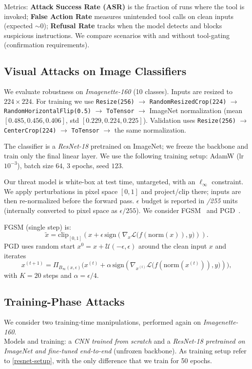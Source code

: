 \documentclass{article}
\begin{document}
Metrics: \textbf{Attack Success Rate (ASR)} is the fraction of runs where the tool is invoked; \textbf{False Action Rate} measures unintended tool calls on clean inputs (expected ${\sim}0$); \textbf{Refusal Rate} tracks when the model detects and blocks suspicious instructions. We compare scenarios with and without tool-gating (confirmation requirements).

\subsection{Visual Attacks on Image Classifiers}
We evaluate robustness on \textit{Imagenette-160} (10 classes). Inputs are resized to $224{\times}224$. For training we use \texttt{Resize(256)} $\rightarrow$ \texttt{RandomResizedCrop(224)} $\rightarrow$ \texttt{RandomHorizontalFlip(0.5)} $\rightarrow$ \texttt{ToTensor} $\rightarrow$ ImageNet normalization (mean $[0.485,0.456,0.406]$, std $[0.229,0.224,0.225]$).\cite{torchvision-resnet18} Validation uses \texttt{Resize(256)} $\rightarrow$ \texttt{CenterCrop(224)} $\rightarrow$ \texttt{ToTensor} $\rightarrow$ the same normalization.

The classifier is a \textit{ResNet-18} pretrained on ImageNet; we freeze the backbone and train only the final linear layer. We use the following training setup: AdamW (lr $10^{-3}$), batch size $64$, $3$ epochs, seed $123$.\label{resnet-setup}

Our threat model is white-box at test time, untargeted, with an $\ell_\infty$ constraint. We apply perturbations in pixel space $[0,1]$ and project/clip there; inputs are then re-normalized before the forward pass. $\epsilon$ budget is reported in \emph{/255} units (internally converted to pixel space as $\epsilon/255$). We consider FGSM~\cite{goodfellow2015explainingharnessingadversarialexamples} and PGD~\cite{madry2019deeplearningmodelsresistant}.

FGSM (single step) is:
\[
  \tilde{x}=\mathrm{clip}_{[0,1]}\!\left(x+\epsilon\,\mathrm{sign}\!\left(\nabla_x \mathcal{L}\big(f(\mathrm{norm}(x)),y\big)\right)\right).
\]
PGD uses random start $x^0 = x + \mathcal{U}(-\epsilon,\epsilon)$ around the clean input $x$ and iterates
\[
  x^{(t+1)}=\Pi_{B_\infty(x,\epsilon)}\!\Big(x^{(t)}+\alpha\,\mathrm{sign}\!\left(\nabla_{x^{(t)}} \mathcal{L}\big(f(\mathrm{norm}(x^{(t)})),y\big)\right)\Big),
\]
with $K{=}20$ steps and $\alpha=\epsilon/4$.

\subsection{Training-Phase Attacks}
We consider two training-time manipulations, performed again on \textit{Imagenette-160}.\\
Models and training: a \emph{CNN trained from scratch} and a \emph{ResNet-18 pretrained on ImageNet and fine-tuned end-to-end} (unfrozen backbone). As training setup refer to \ref{resnet-setup}, with the only difference that we train for 50 epochs.
\end{document}
